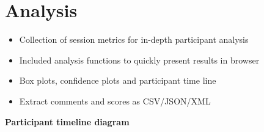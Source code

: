\vspace{-0.8cm}

{\color{emphasisered} \section{Analysis}}


\normalsize

\begin{itemize}%
	\item Collection of session metrics for in-depth participant analysis
	\item Included analysis functions to quickly present results in browser
	\item Box plots, confidence plots and participant time line
	\item Extract comments and scores as CSV/JSON/XML
\end{itemize}
\vspace{-1cm}

\begin{center}
\small
\textbf{Participant timeline diagram}
\end{center}

\vspace{-0.3cm}
